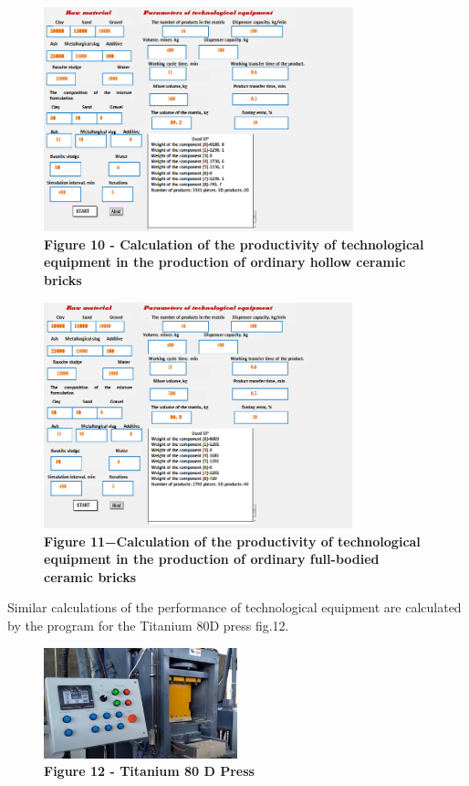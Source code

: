 \begin{figure}[H]
	\centering
	\includegraphics[width=0.8\textwidth]{assets/276}
	\caption*{\bfseries Figure 10 - Calculation of the productivity of technological
	equipment in the production of ordinary hollow ceramic bricks}
\end{figure}



\begin{figure}[H]
	\centering
	\includegraphics[width=0.8\textwidth]{assets/277}
	\caption*{\bfseries Figure 11−Calculation of the productivity of technological
	equipment in the production of ordinary full-bodied ceramic bricks}
\end{figure}



Similar calculations of the performance of technological equipment are
calculated by the program for the Titanium 80D press fig.12.

\begin{figure}[H]
	\centering
	\includegraphics[width=0.5\textwidth]{assets/278}
	\caption*{\bfseries Figure 12 - Titanium 80 D Press}
\end{figure}



